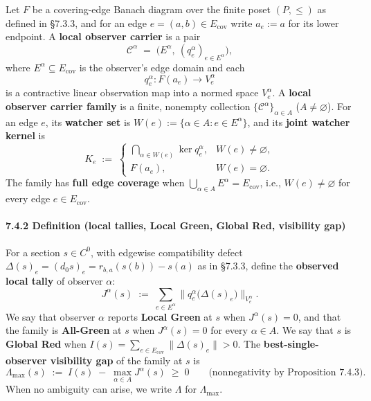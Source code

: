 \documentclass[
  11pt,
]{article}
\begin{document}
Let \(F\) be a covering-edge Banach diagram over the finite poset \((P,\leq)\) as defined in §7.3.3, and for an edge \(e=(a,b)\in E_{\mathrm{cov}}\) write \(a_e:=a\) for its lower endpoint. A \textbf{local observer carrier} is a pair
\[
\mathcal C^\alpha \;=\; \bigl(E^\alpha,\ (q_e^\alpha)_{e\in E^\alpha}\bigr),
\]
where \(E^\alpha\subseteq E_{\mathrm{cov}}\) is the observer's edge domain and each
\[
q_e^\alpha : F(a_e)\longrightarrow V_e^\alpha
\]
is a contractive linear observation map into a normed space \(V_e^\alpha\). A \textbf{local observer carrier family} is a finite, nonempty collection \(\{\mathcal C^\alpha\}_{\alpha\in A}\) (\(A\neq\varnothing\)). For an edge \(e\), its \textbf{watcher set} is \(W(e):=\{\alpha\in A : e\in E^\alpha\}\), and its \textbf{joint watcher kernel} is
\[
K_e \;:=\;
\begin{cases}
\bigcap_{\alpha\in W(e)}\ker q_e^\alpha, & W(e)\neq\varnothing,\\[2pt]
F(a_e), & W(e)=\varnothing .
\end{cases}
\]
The family has \textbf{full edge coverage} when \(\bigcup_{\alpha\in A}E^\alpha=E_{\mathrm{cov}}\), i.e., \(W(e)\neq\varnothing\) for every edge \(e\in E_{\mathrm{cov}}\).

\paragraph{7.4.2 Definition (local tallies, Local Green, Global Red, visibility gap)}\label{definition-local-tallies-local-green-global-red-visibility-gap}

For a section \(s\in C^0\), with edgewise compatibility defect \(\Delta(s)_e = (d_0 s)_e = r_{b,a}(s(b))-s(a)\) as in §7.3.3, define the \textbf{observed local tally} of observer \(\alpha\):
\[
J^\alpha(s)\;:=\;\sum_{e\in E^\alpha}\bigl\lVert q_e^\alpha\bigl(\Delta(s)_e\bigr)\bigr\rVert_{V_e^\alpha}.
\]
We say that observer \(\alpha\) reports \textbf{Local Green} at \(s\) when \(J^\alpha(s)=0\), and that the family is \textbf{All-Green} at \(s\) when \(J^\alpha(s)=0\) for every \(\alpha\in A\). We say that \(s\) is \textbf{Global Red} when \(I(s)=\sum_{e\in E_{\mathrm{cov}}}\lVert\Delta(s)_e\rVert>0\). The \textbf{best-single-observer visibility gap} of the family at \(s\) is
\[
\Lambda_{\max}(s)\;:=\;I(s)\;-\;\max_{\alpha\in A}J^\alpha(s)\;\ge\;0
\qquad\text{(nonnegativity by Proposition 7.4.3).}
\]
When no ambiguity can arise, we write \(\Lambda\) for \(\Lambda_{\max}\).
\end{document}

